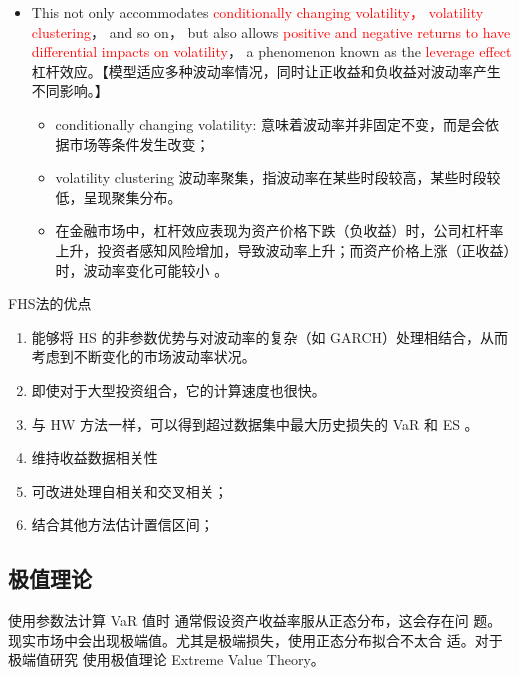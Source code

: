 \begin{itemize}
\begin{itemize}
        \item This not only accommodates \textcolor{red}{conditionally changing volatility， volatility clustering}， and so on， but also allows \textcolor{red}{positive and negative returns to have differential impacts on volatility}， a phenomenon known as the \textcolor{red}{leverage effect} 杠杆效应。【模型适应多种波动率情况，同时让正收益和负收益对波动率产生不同影响。】
        
        \begin{itemize}
            \item conditionally changing volatility: 意味着波动率并非固定不变，而是会依据市场等条件发生改变；
            
            \item volatility clustering 波动率聚集，指波动率在某些时段较高，某些时段较低，呈现聚集分布。
            
            \item 在金融市场中，杠杆效应表现为资产价格下跌（负收益）时，公司杠杆率上升，投资者感知风险增加，导致波动率上升；而资产价格上涨（正收益）时，波动率变化可能较小 。
        \end{itemize}
        
    \end{itemize}


        \begin{knowledgebox}{FHS法的优点}
            \begin{enumerate}
        
            \item 能够将 HS 的非参数优势与对波动率的复杂（如 GARCH）处理相结合，从而考虑到不断变化的市场波动率状况。
        \item 即使对于大型投资组合，它的计算速度也很快。
        \item 与 HW 方法一样，可以得到超过数据集中最大历史损失的 VaR 和 ES 。
        \item 维持收益数据相关性
        \item 可改进处理自相关和交叉相关；
        \item 结合其他方法估计置信区间；
        \end{enumerate}
        \end{knowledgebox}

    

\end{itemize}





\subsection{极值理论}
使用参数法计算 VaR 值时 通常假设资产收益率服从正态分布，这会存在问
题。现实市场中会出现极端值。尤其是极端损失，使用正态分布拟合不太合
适。对于极端值研究 使用极值理论 Extreme Value Theory。
	
